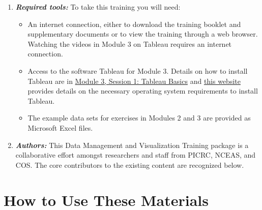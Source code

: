 \documentclass[
]{book}
\providecommand{\tightlist}{%
  \setlength{\itemsep}{0pt}\setlength{\parskip}{0pt}}
\begin{document}
\begin{enumerate}
\def\labelenumi{\arabic{enumi}.}
\setcounter{enumi}{4}
\item
  \textbf{\emph{Required tools:}} To take this training you will need:

  \begin{itemize}
  \tightlist
  \item
    An internet connection, either to download the training booklet and supplementary documents or to view the training through a web browser. Watching the videos in Module 3 on Tableau requires an internet connection.
  \item
    Access to the software Tableau for Module 3. Details on how to install Tableau are in \href{https://nceas.github.io/data-training-picrc-cos/visualizing-data.html\#tableau-basics}{Module 3, Session 1: Tableau Basics} and \href{https://www.tableau.com/products/techspecs\#desktop}{this website} provides details on the necessary operating system requirements to install Tableau.
  \item
    The example data sets for exercises in Modules 2 and 3 are provided as Microsoft Excel files.
  \end{itemize}
\item
  \textbf{\emph{Authors:}} This Data Management and Visualization Training package is a collaborative effort amongst researchers and staff from PICRC, NCEAS, and COS. The core contributors to the existing content are recognized below.
\end{enumerate}

\hypertarget{how-to-use-these-materials}{%
\section{How to Use These Materials}\label{how-to-use-these-materials}}
\end{document}
